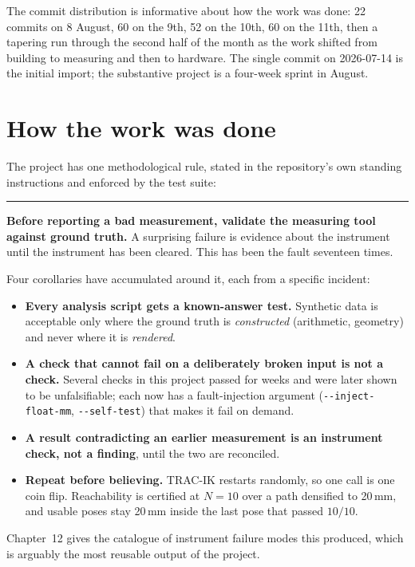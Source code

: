 \documentclass[11pt,a4paper,oneside]{report}
\newcommand{\code}[1]{\texttt{\small #1}}
\newcommand{\keyfact}[1]{%
  \par\vspace{7pt}\noindent
  \hspace*{0pt}\textcolor{srlblue}{\rule{2.5pt}{\dimexpr\baselineskip\relax}}%
  \hspace{9pt}%
  \begin{minipage}[t]{\dimexpr\textwidth-14pt\relax}
  \small #1
  \end{minipage}\par\vspace{7pt}}
\begin{document}
The commit distribution is informative about how the work was done: 22 commits
on 8 August, 60 on the 9th, 52 on the 10th, 60 on the 11th, then a tapering
run through the second half of the month as the work shifted from building to
measuring and then to hardware. The single commit on 2026-07-14 is the initial
import; the substantive project is a four-week sprint in August.

\section{How the work was done}

The project has one methodological rule, stated in the repository's own
standing instructions and enforced by the test suite:

\keyfact{\textbf{Before reporting a bad measurement, validate the measuring
tool against ground truth.} A surprising failure is evidence about the
instrument until the instrument has been cleared. This has been the fault
seventeen times.}

Four corollaries have accumulated around it, each from a specific incident:

\begin{itemize}
\item \textbf{Every analysis script gets a known-answer test.} Synthetic data
      is acceptable only where the ground truth is \emph{constructed}
      (arithmetic, geometry) and never where it is \emph{rendered}.
\item \textbf{A check that cannot fail on a deliberately broken input is not a
      check.} Several checks in this project passed for weeks and were later
      shown to be unfalsifiable; each now has a fault-injection argument
      (\code{-{}-inject-float-mm}, \code{-{}-self-test}) that makes it fail on
      demand.
\item \textbf{A result contradicting an earlier measurement is an instrument
      check, not a finding}, until the two are reconciled.
\item \textbf{Repeat before believing.} TRAC-IK restarts randomly, so one call
      is one coin flip. Reachability is certified at $N=10$ over a path
      densified to 20\,mm, and usable poses stay 20\,mm inside the last pose
      that passed $10/10$.
\end{itemize}

Chapter~12 gives the catalogue of instrument failure modes this produced,
which is arguably the most reusable output of the project.
\end{document}
